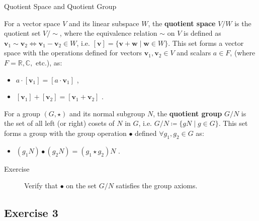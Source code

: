 \documentclass{beamer}
\newcommand\boldtext[1]{\textcolor{bolds}{\textbf{#1}}}
\begin{document}
\begin{frame}{Quotient Space and Quotient Group}
    \begin{definition}
        For a vector space $V$ and its linear subspace $W$, the \boldtext{quotient space} $V/W$ is the quotient set $V/{\sim}$, where the equivalence relation $\sim$ on $V$ is defined as $\mathbf{v}_1\sim\mathbf{v}_2\iff\mathbf{v}_1-\mathbf{v}_2\in W$, i.e. $[\mathbf{v}]=\{\mathbf{v}+\mathbf{w}\mid\mathbf{w}\in W\}$. This set forms a vector space with the operations defined for vectors $\mathbf{v}_1,\mathbf{v}_2\in V$ and scalars $a\in F$, (where $F=\mathbb{R}, \mathbb{C},$ etc.), as:
        \begin{itemize}
            \item $a\cdot[\mathbf{v}_1]=[a\cdot\mathbf{v}_1]$ ,
            \item $[\mathbf{v}_1]+[\mathbf{v}_2]=[\mathbf{v}_1+\mathbf{v}_2]$ .
        \end{itemize}
    \end{definition}
    \begin{definition}
        For a group $(G,\star)$ and its normal subgroup $N$, the \boldtext{quotient group} $G/N$ is the set of all left (or right) cosets of $N$ in $G$, i.e. $G/N\coloneqq\{gN\mid g\in G\}$. This set forms a group with the group operation $\bullet$ defined $\forall g_1,g_2\in G$ as:
        \begin{itemize}
            \item $(g_1N)\bullet(g_2N)=(g_1\star g_2)N$ .
        \end{itemize}
    \end{definition}
    \begin{description}
        \item[Exercise] Verify that $\bullet$ on the set $G/N$ satisfies the group axioms.
    \end{description}
\end{frame}

\subsection{Exercise 3}
\end{document}

